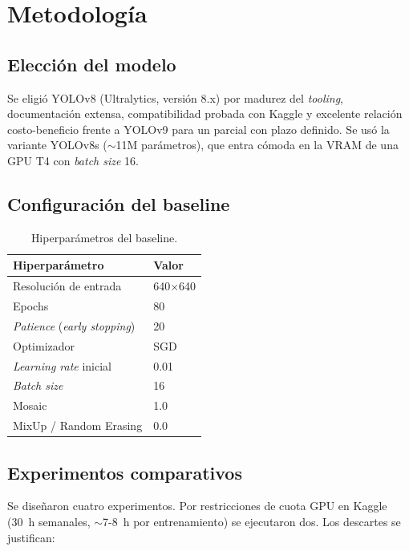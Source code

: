 \documentclass[conference]{IEEEtran}
\begin{document}
\section{Metodología}

\subsection{Elección del modelo}

Se eligió YOLOv8 \cite{ultralytics2023} (Ultralytics, versión 8.x)
por madurez del \emph{tooling}, documentación extensa,
compatibilidad probada con Kaggle y excelente relación
costo-beneficio frente a YOLOv9 para un parcial con plazo definido.
Se usó la variante YOLOv8s ($\sim$11M parámetros), que entra cómoda
en la VRAM de una GPU T4 con \textit{batch size} 16.

\subsection{Configuración del baseline}

\begin{table}[h]
\centering
\caption{Hiperparámetros del baseline.}
\label{tab:hyp}
\renewcommand{\arraystretch}{1.1}
\begin{tabular}{l l}
\toprule
\textbf{Hiperparámetro} & \textbf{Valor} \\
\midrule
Resolución de entrada & 640$\times$640 \\
Epochs & 80 \\
\textit{Patience} (\textit{early stopping}) & 20 \\
Optimizador & SGD \\
\textit{Learning rate} inicial & 0.01 \\
\textit{Batch size} & 16 \\
Mosaic & 1.0 \\
MixUp / Random Erasing & 0.0 \\
\bottomrule
\end{tabular}
\end{table}

\subsection{Experimentos comparativos}

Se diseñaron cuatro experimentos. Por restricciones de cuota GPU en
Kaggle (30~h semanales, $\sim$7-8~h por entrenamiento) se
ejecutaron dos. Los descartes se justifican:
\end{document}
